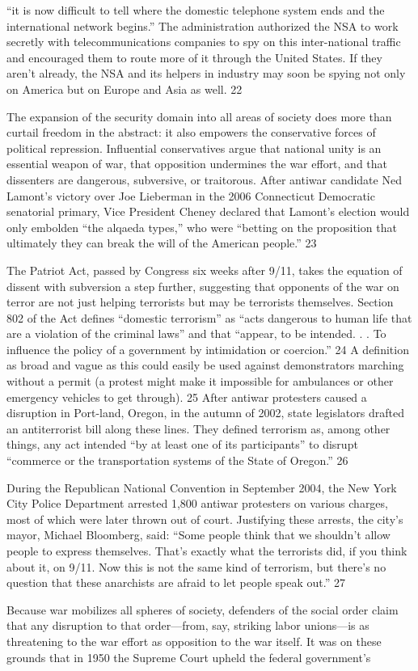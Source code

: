 “it is now difficult to tell where the domestic telephone system ends and the international network begins.” The administration authorized the NSA to work secretly with telecommunications companies to spy on this inter-national traffic and encouraged them to route more of it through the United States. If they aren’t already, the NSA and its helpers in industry may soon be spying not only on America but on Europe and Asia as well. {\color{blue} 22 } {\par} The expansion of the security domain into all areas of society does more than curtail freedom in the abstract: it also empowers the conservative forces of political repression. Influential conservatives argue that national unity is an essential weapon of war, that opposition undermines the war effort, and that dissenters are dangerous, subversive, or traitorous. After antiwar candidate Ned Lamont’s victory over Joe Lieberman in the 2006 Connecticut Democratic senatorial primary, Vice President Cheney declared that Lamont’s election would only embolden “the alqaeda types,” who were “betting on the proposition that ultimately they can break the will of the American people.” {\color{blue} 23 } {\par} The Patriot Act, passed by Congress six weeks after 9/11, takes the equation of dissent with subversion a step further, suggesting that opponents of the war on terror are not just helping terrorists but may be terrorists themselves. Section {\color{blue} 802 } of the Act defines “domestic terrorism” as “acts dangerous to human life that are a violation of the criminal laws” and that “appear, to be intended. . . To influence the policy of a government by intimidation or coercion.” {\color{blue} 24 } A definition as broad and vague as this could easily be used against demonstrators marching without a permit (a protest might make it impossible for ambulances or other emergency vehicles to get through). {\color{blue} 25 } After antiwar protesters caused a disruption in Port-land, Oregon, in the autumn of 2002, state legislators drafted an antiterrorist bill along these lines. They defined terrorism as, among other things, any act intended “by at least one of its participants” to disrupt “commerce or the transportation systems of the State of Oregon.” {\color{blue} 26 } {\par} During the Republican National Convention in September 2004, the New York City Police Department arrested 1,800 antiwar protesters on various charges, most of which were later thrown out of court. Justifying these arrests, the city’s mayor, Michael Bloomberg, said: “Some people think that we shouldn’t allow people to express themselves. That’s exactly what the terrorists did, if you think about it, on 9/11. Now this is not the same kind of terrorism, but there’s no question that these anarchists are afraid to let people speak out.” {\color{blue} 27 } {\par} Because war mobilizes all spheres of society, defenders of the social order claim that any disruption to that order—from, say, striking labor unions—is as threatening to the war effort as opposition to the war itself. It was on these grounds that in 1950 the Supreme Court upheld the federal government’s 